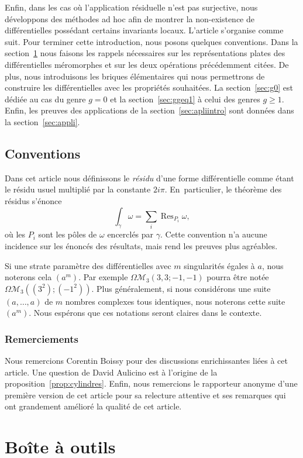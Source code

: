 \documentclass[11pt]{article}
\numberwithin{equation}{section}\renewcommand{\proofname}{Démonstration}
\let\mathcal\mathscr
\newcommand\Res{\operatorname{Res}}
\newcommand{\omoduli}[1][g]{{\Omega\mathcal M}_{\!#1}}
\theoremstyle{definition}
\begin{document}
Enfin, dans les cas où l'application résiduelle n'est pas surjective, nous développons des méthodes ad hoc afin de montrer la non-existence de différentielles possédant certains invariants locaux.
L'article s'organise comme suit. Pour terminer cette introduction, nous posons quelques conventions. Dans la section~\ref{sec:bao} nous faisons les rappels nécessaires sur les représentations plates des différentielles méromorphes et sur les deux opérations précédemment citées. De plus, nous introduisons les briques élémentaires qui nous permettrons de construire les différentielles avec les propriétés souhaitées. La section~\ref{sec:g0} est dédiée au cas du genre $g=0$ et la section~\ref{sec:ggeq1} à celui des genres $g\geq1$. Enfin, les preuves des applications de la section~\ref{sec:apliintro} sont données dans la section~\ref{sec:appli}.

\subsection{Conventions}
Dans cet article nous définissons le \emph{résidu} d'une forme différentielle comme étant le résidu usuel multiplié par la constante $2i\pi$. En~particulier, le théorème des résidus s'énonce
\[\int_{\gamma}\omega=\sum_{i} \Res_{P_{i}}\omega ,\]
où les $P_{i}$ sont les pôles de $\omega$ encerclés par $\gamma$. Cette convention n'a aucune incidence sur les énoncés des résultats, mais rend les preuves plus agréables.

Si une strate paramètre des différentielles avec $m$ singularités égales à $a$, nous noterons cela $(a^{m})$. Par exemple $\omoduli[3](3,3;-1,-1)$ pourra être notée $\omoduli[3]((3^{2});(-1^{2}))$. Plus généralement, si nous considérons une suite $(a,\dots,a)$ de $m$ nombres complexes tous identiques, nous noterons cette suite $(a^{m})$. Nous espérons que ces notations seront claires dans le contexte.

\subsubsection*{Remerciements}
Nous remercions Corentin Boissy pour des discussions enrichissantes liées à cet article. Une question de David Aulicino est à l'origine de la proposition~\ref{prop:cylindres}. Enfin, nous remercions le rapporteur anonyme d'une première version de cet article pour sa relecture attentive et ses remarques qui ont grandement amélioré la qualité de cet article.

\section{Boîte à outils}
\label{sec:bao}
\end{document}
